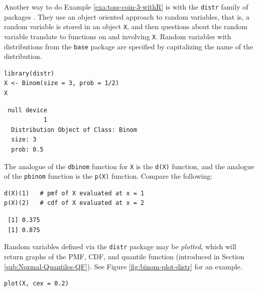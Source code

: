 \documentclass[captions=tableheading]{scrbook}
\begin{document}
\begin{example}
Another way to do Example \ref{exa:toss-coin-3-withR} is with the \texttt{distr} family of packages \cite{Ruckdescheldistr}. They use an object oriented approach to random variables, that is, a random variable is stored in an object \texttt{X}, and then questions about the random variable translate to functions on and involving \texttt{X}. Random variables with distributions from the \texttt{base} package are specified by capitalizing the name of the distribution.


\begin{verbatim}
library(distr)
X <- Binom(size = 3, prob = 1/2)
X
\end{verbatim}

\begin{verbatim}
 null device 
           1
  Distribution Object of Class: Binom
  size: 3
  prob: 0.5
\end{verbatim}

The analogue of the \texttt{dbinom} function for \texttt{X} is the \texttt{d(X)} function, and the analogue of the \texttt{pbinom} function is the \texttt{p(X)} function. Compare the following:


\begin{verbatim}
d(X)(1)   # pmf of X evaluated at x = 1
p(X)(2)   # cdf of X evaluated at x = 2
\end{verbatim}

\begin{verbatim}
 [1] 0.375
 [1] 0.875
\end{verbatim}

\end{example}

Random variables defined via the \texttt{distr} package may be \emph{plotted}, which will return graphs of the PMF, CDF, and quantile function (introduced in Section \ref{sub:Normal-Quantiles-QF}). See Figure \ref{fig:binom-plot-distr} for an example.



\begin{verbatim}
plot(X, cex = 0.2)
\end{verbatim}
\end{document}
